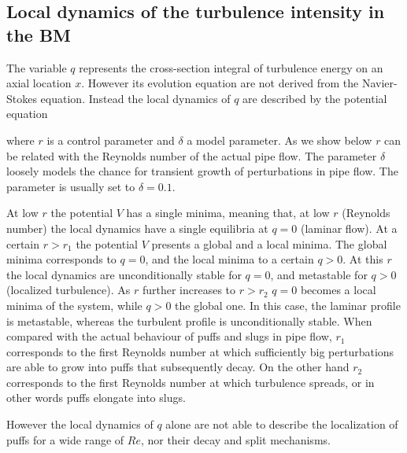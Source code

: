 \documentclass{article}
\begin{document}
\subsection{Local dynamics of the turbulence intensity in the BM}
The variable $q$ represents the cross-section integral of turbulence energy on an axial location $x$. However its evolution equation are not derived from the Navier-Stokes equation. Instead the local dynamics of $q$ are described by the potential equation

where $r$ is a control parameter and $\delta$ a model parameter. As we show below $r$ can be related with the Reynolds number of the actual pipe flow. The parameter $\delta$ loosely models the chance for transient growth of perturbations in pipe flow. The parameter is usually set to $\delta=0.1$. 

At low $r$ the potential $V$ has a single minima, meaning that, at low $r$ (Reynolds number) the local dynamics have a single equilibria at $q=0$ (laminar flow). At a certain $r>r_{1}$ the potential $V$ presents a global and a local minima. The global minima corresponds to $q=0$, and the local minima to a certain $q>0$. At this $r$ the local dynamics are unconditionally stable for $q=0$, and metastable for $q>0$ (localized turbulence). As $r$ further increases to $r>r_{2}$ $q=0$ becomes a local minima of the system, while $q>0$ the global one. In this case, the laminar profile is metastable, whereas the turbulent profile is unconditionally stable. When compared with the actual behaviour of puffs and slugs in pipe flow, $r_{1}$ corresponds to the first Reynolds number at which sufficiently big perturbations are able to grow into puffs that subsequently decay. On the other hand $r_{2}$ corresponds to the first Reynolds number at which turbulence spreads, or in other words puffs elongate into slugs. 

However the local dynamics of $q$ alone are not able to describe the localization of puffs for a wide range of $Re$, nor their decay and split mechanisms. 




















\end{document}
